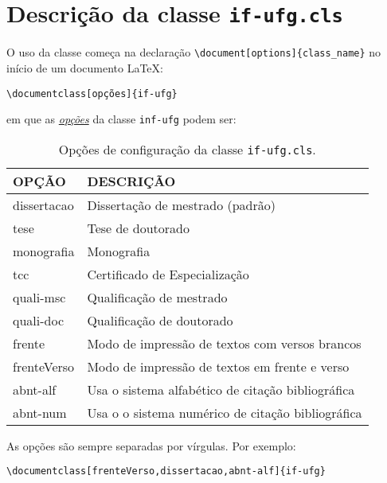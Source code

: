 \chapter{Descrição da classe \texttt{if-ufg.cls}}
\label{capitulo2}

O uso da classe começa na declaração \verb$\document[options]{class_name}$ no início de um documento \LaTeX:

\begin{lstlisting}[style=lista]
\documentclass[opções]{if-ufg}
\end{lstlisting}

\noindent
em que as \uline{\emph{opções}} da classe \texttt{inf-ufg} podem ser:

\begin{table}[!h]
\centering
\caption{Opções de configuração da classe \texttt{if-ufg.cls}.}
\label{tab:opcoes_classe}
\begin{tabular}{m{4cm}m{9cm}}
\hline
\textbf{OPÇÃO} & \textbf{DESCRIÇÃO} \\ \hline
dissertacao & Dissertação de mestrado (padrão) \\ \hline
tese & Tese de doutorado \\ \hline
monografia & Monografia \\ \hline
tcc & Certificado de Especialização \\ \hline
quali-msc & Qualificação de mestrado \\ \hline
quali-doc & Qualificação de doutorado \\ \hline
frente & Modo de impressão de textos com versos brancos \\ \hline
frenteVerso & Modo de impressão de textos em frente e verso \\ \hline
abnt-alf & Usa o sistema alfabético de citação bibliográfica \\ \hline
abnt-num & Usa o o sistema numérico de citação bibliográfica \\ \hline
\end{tabular}
\end{table}

\noindent
As opções são sempre separadas por vírgulas. Por exemplo:

\begin{lstlisting}[style=lista]
\documentclass[frenteVerso,dissertacao,abnt-alf]{if-ufg}
\end{lstlisting}

